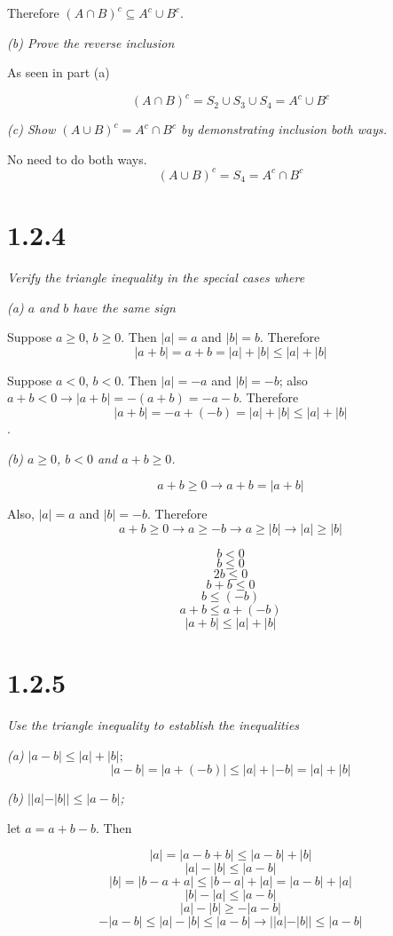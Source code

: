 \documentclass[11pt,oneside,titlepage]{book}
\begin{document}
Therefore $ (A \cap B)^c \subseteq A^c \cup B^c$.

\textit{(b) Prove the reverse inclusion}


As seen in part (a)

$$(A \cap B)^c = S_2 \cup S_3 \cup S_4 = A^c \cup B^c$$

\textit{(c) Show $(A \cup B)^c = A^c \cap B^c$ by demonstrating inclusion both
  ways.}

No need to do both ways.
$$(A \cup B)^c = S_4 = A^c \cap B^c$$


\section*{1.2.4}
\textit{Verify the triangle inequality in the special cases where }

\textit{(a) $a$ and $b$ have the same sign}

Suppose $a \geq 0$, $b \geq 0$. Then $|a| = a$ and $|b| = b$. Therefore
$$|a + b| = a + b = |a| + |b| \leq  |a| + |b|$$

Suppose $a < 0$, $b < 0$. Then $|a| = -a$ and $|b| = -b$; also $a + b < 0 \to
|a + b| = -(a + b) = -a - b$. Therefore 
$$|a + b| = -a + (-b) = |a| + |b| \leq  |a| + |b|$$.

\textit{(b) $a \geq 0$, $b < 0$ and $a + b \geq 0$.}

$$a + b \geq 0 \to a + b = |a + b|$$

Also, $|a| = a$ and $|b| = -b$. Therefore
$$a + b \geq 0 \to a \geq -b \to a \geq |b| \to |a| \geq |b|$$

$$ b < 0$$
$$ b \leq 0$$
$$ 2b \leq 0$$
$$ b + b \leq 0$$
$$ b \leq (-b)$$
$$a + b \leq a + (-b)$$
$$|a + b| \leq |a| + |b|$$

\section*{1.2.5}
\textit{Use the triangle inequality to establish the inequalities}

\textit{(a) $|a - b| \leq |a| + |b|;$}
$$|a - b| = |a + (-b)| \leq |a| + |-b| = |a| + |b|$$

\textit{(b) $||a| - |b|| \leq |a - b|$;}

let $a = a + b - b$. Then

$$|a| = |a - b + b| \leq |a - b| + |b|$$
$$|a| - |b| \leq |a - b|$$
$$|b| = |b - a + a| \leq |b - a| + |a| = |a - b| + |a|$$
$$|b| - |a| \leq |a - b|$$
$$|a| - |b| \geq -|a - b|$$
$$-|a - b| \leq |a| - |b| \leq |a - b| \to ||a| - |b|| \leq |a - b|$$
\end{document}
